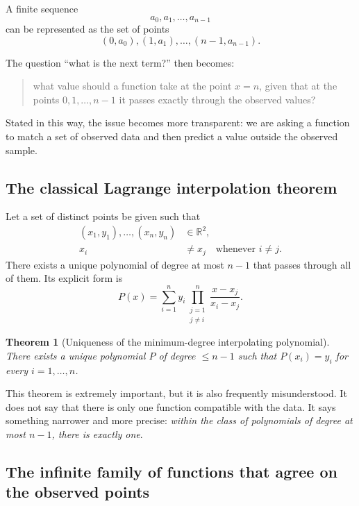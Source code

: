 \documentclass[10pt, a4paper]{article}
\theoremstyle{plain}
\newtheorem{theorem}{Theorem}
\theoremstyle{definition}
\theoremstyle{remark}
\begin{document}
A finite sequence
\[
a_0, a_1, \ldots, a_{n-1}
\]
can be represented as the set of points
\[
(0,a_0), (1,a_1), \ldots, (n-1,a_{n-1}).
\]

The question ``what is the next term?'' then becomes:
\begin{quote}
what value should a function take at the point $x=n$, given that at the points
$0,1,\ldots,n-1$ it passes exactly through the observed values?
\end{quote}

Stated in this way, the issue becomes more transparent: we are asking a
function to match a set of observed data and then predict a value outside the
observed sample.

\subsection{The classical Lagrange interpolation theorem}

Let a set of distinct points be given such that
\[
\begin{aligned}
(x_1,y_1), \ldots, (x_n,y_n) &\in \mathbb{R}^2,\\
x_i &\neq x_j \quad \text{whenever } i \neq j.
\end{aligned}
\]
There exists a unique polynomial of degree at most
$n-1$ that passes through all of them. Its explicit form is
\begin{equation}
P(x)=\sum_{i=1}^{n} y_i \prod_{\substack{j=1 \\ j\neq i}}^{n}
\frac{x-x_j}{x_i-x_j}.
\label{eq:lagrange}
\end{equation}

\begin{theorem}[Uniqueness of the minimum-degree interpolating polynomial]
There exists a unique polynomial $P$ of degree $\leq n-1$ such that
$P(x_i)=y_i$ for every $i=1,\ldots,n$.
\end{theorem}

This theorem is extremely important, but it is also frequently misunderstood. It
does not say that there is only one function compatible with the data. It says
something narrower and more precise: \emph{within the class of polynomials of
degree at most $n-1$, there is exactly one}.

\subsection{The infinite family of functions that agree on the observed points}
\end{document}
